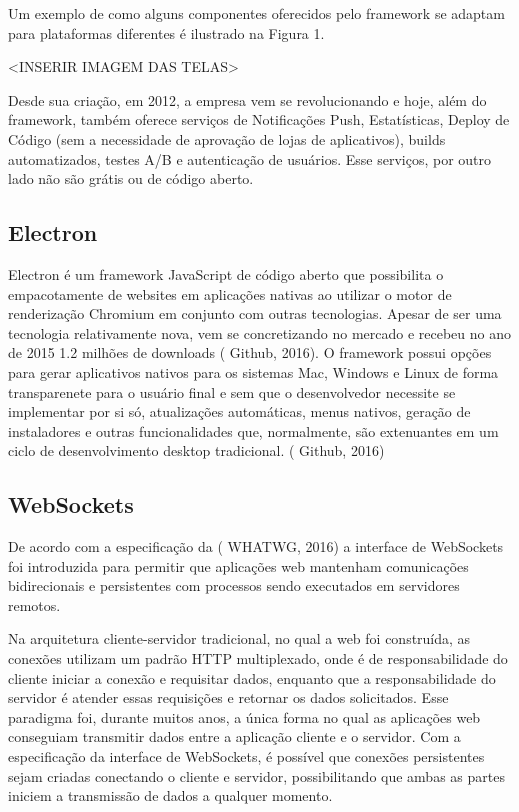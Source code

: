 Um exemplo de como alguns componentes oferecidos pelo framework se adaptam para plataformas diferentes é ilustrado na Figura 1.

<INSERIR IMAGEM DAS TELAS>

Desde sua criação, em 2012, a empresa vem se revolucionando e hoje, além do framework, também oferece serviços de Notificações Push, Estatísticas, Deploy de Código (sem a necessidade de aprovação de lojas de aplicativos), builds automatizados, testes A/B e autenticação de usuários. Esse serviços, por outro lado não são grátis ou de código aberto.

\subsection{\esp Electron}

Electron é um framework JavaScript de código aberto que possibilita o empacotamente de websites em aplicações nativas ao utilizar o motor de renderização Chromium em conjunto com outras tecnologias. Apesar de ser uma tecnologia relativamente nova, vem se concretizando no mercado e recebeu no ano de 2015 1.2 milhões de downloads ( Github, 2016). O framework possui opções para gerar aplicativos nativos para os sistemas Mac, Windows e Linux de forma transparenete para o usuário final e sem que o desenvolvedor necessite se implementar por si só, atualizações automáticas, menus nativos, geração de instaladores e outras funcionalidades que, normalmente, são extenuantes em um ciclo de desenvolvimento desktop tradicional. ( Github, 2016)

\subsection{\esp WebSockets}

De acordo com a especificação da ( WHATWG, 2016) a interface de WebSockets foi introduzida para permitir que aplicações web mantenham comunicações bidirecionais e persistentes com processos sendo executados em servidores remotos.

Na arquitetura cliente-servidor tradicional, no qual a web foi construída, as conexões utilizam um padrão HTTP multiplexado, onde é de responsabilidade do cliente iniciar a conexão e requisitar dados, enquanto que a responsabilidade do servidor é atender essas requisições e retornar os dados solicitados. Esse paradigma foi, durante muitos anos, a única forma no qual as aplicações web conseguiam transmitir dados entre a aplicação cliente e o servidor. Com a especificação da interface de WebSockets, é possível que conexões persistentes sejam criadas conectando o cliente e servidor, possibilitando que ambas as partes iniciem a transmissão de dados a qualquer momento.

